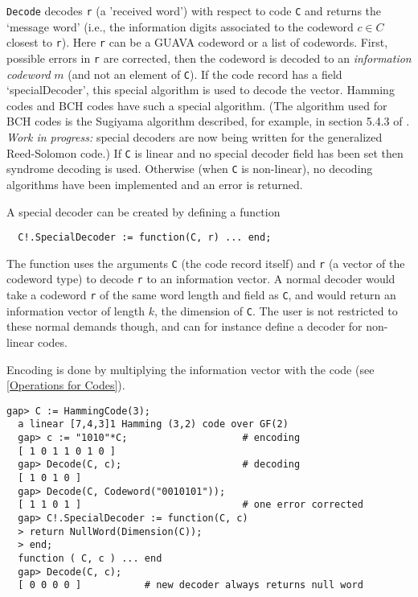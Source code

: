 \documentclass[11pt]{report}
\begin{document}
{{{ \texttt{Decode} decodes \mbox{\texttt{r}} (a 'received word') with respect to code \mbox{\texttt{C}} and returns the `message word' (i.e., the information digits associated to the
codeword $c \in C$ closest to \mbox{\texttt{r}}). Here \mbox{\texttt{r}} can be a \textsf{GUAVA} codeword or a list of codewords. First, possible errors in \mbox{\texttt{r}} are corrected, then the codeword is decoded to an \emph{information codeword} $m$ (and not an element of \mbox{\texttt{C}}). If the code record has a field `specialDecoder', this special algorithm is
used to decode the vector. Hamming codes and BCH codes have such a special
algorithm. (The algorithm used for BCH codes is the Sugiyama algorithm
described, for example, in section 5.4.3 of \cite{HP03}. \emph{Work in progress:} special decoders are now being written for the generalized Reed-Solomon code.)
If \mbox{\texttt{C}} is linear and no special decoder field has been set then syndrome decoding is
used. Otherwise (when \mbox{\texttt{C}} is non-linear), no decoding algorithms have been implemented and an error is
returned. 

 A special decoder can be created by defining a function 
\begin{verbatim}  C!.SpecialDecoder := function(C, r) ... end;
\end{verbatim}
 The function uses the arguments \mbox{\texttt{C}} (the code record itself) and \mbox{\texttt{r}} (a vector of the codeword type) to decode \mbox{\texttt{r}} to an information vector. A normal decoder would take a codeword \mbox{\texttt{r}} of the same word length and field as \mbox{\texttt{C}}, and would return an information vector of length $k$, the dimension of \mbox{\texttt{C}}. The user is not restricted to these normal demands though, and can for
instance define a decoder for non-linear codes. 

 Encoding is done by multiplying the information vector with the code (see \ref{Operations for Codes}). }

 
\begin{Verbatim}[fontsize=\small,frame=single,label=Example]
  gap> C := HammingCode(3);
  a linear [7,4,3]1 Hamming (3,2) code over GF(2)
  gap> c := "1010"*C;                    # encoding
  [ 1 0 1 1 0 1 0 ]
  gap> Decode(C, c);                     # decoding
  [ 1 0 1 0 ]
  gap> Decode(C, Codeword("0010101"));
  [ 1 1 0 1 ]                            # one error corrected
  gap> C!.SpecialDecoder := function(C, c)
  > return NullWord(Dimension(C));
  > end;
  function ( C, c ) ... end
  gap> Decode(C, c);
  [ 0 0 0 0 ]           # new decoder always returns null word 
\end{Verbatim}
  

}}
\end{document}
